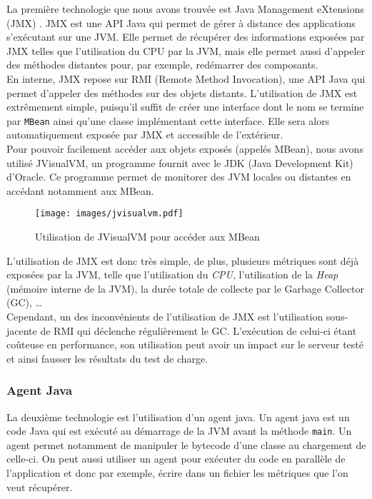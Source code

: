 La première technologie que nous avons trouvée est Java Management eXtensions (JMX) \cite{jmx}. JMX est une API Java qui permet de gérer à distance des applications s'exécutant sur une JVM. Elle permet de récupérer des informations exposées par JMX telles que l'utilisation du CPU par la JVM, mais elle permet aussi d'appeler des méthodes distantes pour, par exemple, redémarrer des composants.\\

En interne, JMX repose sur RMI (Remote Method Invocation), une API Java qui permet d'appeler des méthodes sur des objets distants. L'utilisation de JMX est extrêmement simple, puisqu'il suffit de créer une interface dont le nom se termine par \verb+MBean+ ainsi qu'une classe implémentant cette interface. Elle sera alors automatiquement exposée par JMX et accessible de l'extérieur.\\

Pour pouvoir facilement accéder aux objets exposés (appelés MBean), nous avons utilisé JVisualVM, un programme fournit avec le JDK (Java Development Kit) d'Oracle. Ce programme permet de monitorer des JVM locales ou distantes en accédant notamment aux MBean.

\begin{figure}[H]
 \centering
 \texttt{[image: images/jvisualvm.pdf]}
 \caption{Utilisation de JVisualVM pour accéder aux MBean}
\end{figure}


L'utilisation de JMX est donc très simple, de plus, plusieurs métriques sont déjà exposées par la JVM, telle que l'utilisation du \textit{CPU}, l'utilisation de la \textit{Heap} (mémoire interne de la JVM), la durée totale de collecte par le Garbage Collector (GC), \dots{}\\

Cependant, un des inconvénients de l'utilisation de JMX est l'utilisation sous-jacente de RMI qui déclenche régulièrement le GC. L'exécution de celui-ci étant coûteuse en performance, son utilisation peut avoir un impact sur le serveur testé et ainsi fausser les résultats du test de charge.

\subsubsection{Agent Java}

La deuxième technologie est l'utilisation d'un agent java. Un agent java est un code Java qui est exécuté au démarrage de la JVM avant la méthode \verb+main+. Un agent permet notamment de manipuler le bytecode d'une classe au chargement de celle-ci. On peut aussi utiliser un agent pour exécuter du code en parallèle de l'application et donc par exemple, écrire dans un fichier les métriques que l'on veut récupérer.\\

